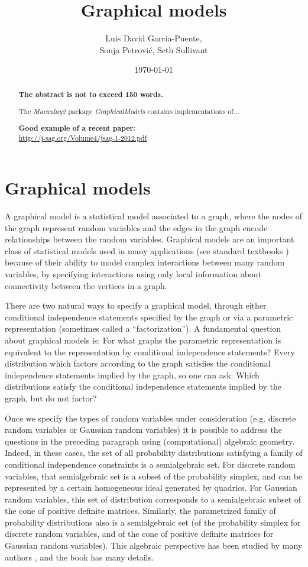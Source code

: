 \documentclass[letterpaper]{article}
\title{Graphical models}
\author{Luis David Garcia-Puente, \\Sonja Petrovi\'c, Seth Sullivant}
\date{\today}
\theoremstyle{definition}
\begin{document}
\maketitle
\begin{abstract}
{\bf The abstract is not to exceed 150 words.}

The \emph{Macaulay2} package \emph{GraphicalModels} contains implementations of...

{\bf Good example of a recent paper:}\\ \url{http://j-sag.org/Volume4/jsag-1-2012.pdf}
\end{abstract}


\section{Graphical models}
A graphical model is a statistical model associated to a graph,
where the nodes of the graph represent random variables and the
edges in the graph encode relationships between the random variables.
Graphical models are an important class of statistical models used
in many applications (see standard textbooks \cite{Lauritzen, Whitaker})
because of their ability to model complex interactions between
many random variables, by specifying
interactions using only local information about connectivity
between the vertices in a graph.

There are two natural ways to specify a graphical model, through 
either conditional independence statements specified by the graph
or via a parametric representation (sometimes called a ``factorization'').
A fundamental question about graphical models is: For what
graphs the parametric representation is equivalent to the
representation by conditional independence statements?
Every distribution which factors according to the graph
satisfies the conditional independence statements implied by the 
graph, so one can ask:  Which distributions satisfy the conditional
independence statements implied by the graph, but do not factor?

Once we specify the types of random variables under consideration
(e.g. discrete random variables or Gaussian random variables) it
is possible to address the questions in the preceding paragraph
using (computational) algebraic geometry.  Indeed, in these cases,
the set of all probability distributions satisfying a family of 
conditional independence constraints is a semialgebraic set.
For discrete random variables, that semialgebraic set is a subset
of the probability simplex, and can be represented by a certain
homogeneous ideal generated by quadrics.  For Gaussian random variables,
this set of distribution corresponds to a semialgebraic subset
of the cone of positive definite matrices.  Similarly,
the parametrized family of probability distributions also
is a semialgebraic set (of the probability simplex for discrete
random variables, and of the cone of positive definite matrices
for Gaussian random variables).  This algebraic perspective
has been studied by many authors \cite{}, and the book \cite{DSS}
has many details.
\end{document}
